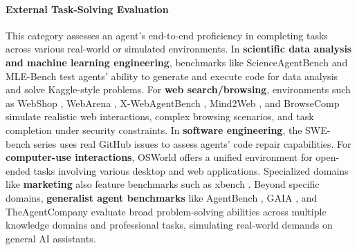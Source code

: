 \documentclass[10pt]{article} %
\begin{document}
\paragraph{External Task-Solving Evaluation}
This category assesses an agent's end-to-end proficiency in completing tasks across various real-world or simulated environments. In \textbf{scientific data analysis and machine learning engineering}, benchmarks like ScienceAgentBench \citep{chen2024scienceagentbench} and MLE-Bench \citep{chan2024mle} test agents' ability to generate and execute code for data analysis and solve Kaggle-style problems. For \textbf{web search/browsing}, environments such as WebShop \citep{yao2022webshop}, WebArena \citep{zhou2023webarena}, X-WebAgentBench \citep{wang2025x}, Mind2Web \citep{deng2023mind2web}, and BrowseComp \citep{wei2025browsecomp} simulate realistic web interactions, complex browsing scenarios, and task completion under security constraints. In \textbf{software engineering}, the SWE-bench series \citep{jimenez2023swe, swebenchverified, aleithan2024swe, yang2024swe} uses real GitHub issues to assess agents' code repair capabilities. For \textbf{computer-use interactions}, OSWorld \citep{xie2024osworld} offers a unified environment for open-ended tasks involving various desktop and web applications. Specialized domains like \textbf{marketing} also feature benchmarks such as xbench \citep{chen2025xbench}. Beyond specific domains, \textbf{generalist agent benchmarks} like AgentBench \citep{liu2023agentbench}, GAIA \citep{mialon2023gaia}, and TheAgentCompany \citep{xu2024theagentcompany} evaluate broad problem-solving abilities across multiple knowledge domains and professional tasks, simulating real-world demands on general AI assistants.
\end{document}
